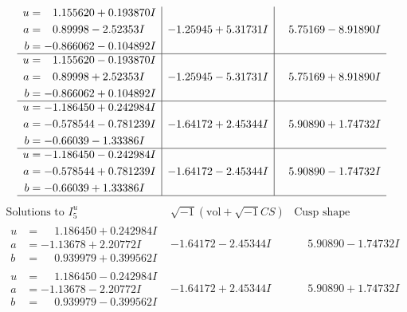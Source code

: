 \documentclass[1p]{elsarticle_modified}
\theoremstyle{definition}
\newcommand{\I}{\sqrt{-1}}
\begin{document}
$$\begin{array}{c|c|c}
\begin{aligned}
u &= \phantom{-}1.155620 + 0.193870 I \\
a &= \phantom{-}0.89998 - 2.52353 I \\
b &= -0.866062 - 0.104892 I\end{aligned}
 & -1.25945 + 5.31731 I & \phantom{-}5.75169 - 8.91890 I \\ \hline\begin{aligned}
u &= \phantom{-}1.155620 - 0.193870 I \\
a &= \phantom{-}0.89998 + 2.52353 I \\
b &= -0.866062 + 0.104892 I\end{aligned}
 & -1.25945 - 5.31731 I & \phantom{-}5.75169 + 8.91890 I \\ \hline\begin{aligned}
u &= -1.186450 + 0.242984 I \\
a &= -0.578544 - 0.781239 I \\
b &= -0.66039 - 1.33386 I\end{aligned}
 & -1.64172 + 2.45344 I & \phantom{-}5.90890 + 1.74732 I \\ \hline\begin{aligned}
u &= -1.186450 - 0.242984 I \\
a &= -0.578544 + 0.781239 I \\
b &= -0.66039 + 1.33386 I\end{aligned}
 & -1.64172 - 2.45344 I & \phantom{-}5.90890 - 1.74732 I\\
 \hline 
 \end{array}$$\newpage$$\begin{array}{c|c|c}  
\text{Solutions to }I^u_{5}& \I (\text{vol} + \sqrt{-1}CS) & \text{Cusp shape}\\
 \hline 
\begin{aligned}
u &= \phantom{-}1.186450 + 0.242984 I \\
a &= -1.13678 + 2.20772 I \\
b &= \phantom{-}0.939979 + 0.399562 I\end{aligned}
 & -1.64172 - 2.45344 I & \phantom{-}5.90890 - 1.74732 I \\ \hline\begin{aligned}
u &= \phantom{-}1.186450 - 0.242984 I \\
a &= -1.13678 - 2.20772 I \\
b &= \phantom{-}0.939979 - 0.399562 I\end{aligned}
 & -1.64172 + 2.45344 I & \phantom{-}5.90890 + 1.74732 I \\ \hline\begin{aligned}

\end{aligned}
\end{array}$$
\end{document}
